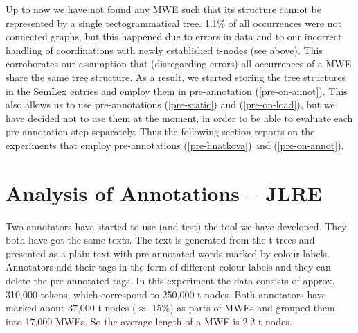 

Up to now we have not found any MWE such that its structure cannot be represented by a single tectogrammatical tree. 1.1\% of all occurrences were not connected graphs, but this happened due to errors in data and to our incorrect handling of coordinations with newly established t-nodes (see above). This corroborates our assumption that (disregarding errors) all occurrences of a MWE share the same tree structure. As a result, we started storing the tree structures in the SemLex entries and employ them in pre-annotation (\ref{pre-on-annot}). This also allows us to use pre-annotations (\ref{pre-static}) and (\ref{pre-on-load}), but we have decided not to use them at the moment, in order to be able to evaluate each pre-annotation step separately. Thus the following section reports on the experiments that employ pre-annotations (\ref{pre-hnatkova}) and (\ref{pre-on-annot}).


\section{Analysis of Annotations – JLRE}
\label{sec:annot:analysis}
Two annotators have started to use (and test) the tool we have developed.
They both have got the same texts. The text is generated from the t-trees and presented as a plain text with pre-annotated words mark\-ed by colour labels. Annotators add their tags in the form of different colour labels and they can delete the pre-annotated tags. 
In this experiment the data consists of approx. 310,000 tokens, which correspond to 250,000 t-nodes.
Both annotators have marked about 37,000 t-nodes ($\approx$ 15\%) as parts of MWEs and grouped them into 17,000 MWEs. So the average length of a MWE is 2.2 t-nodes.


